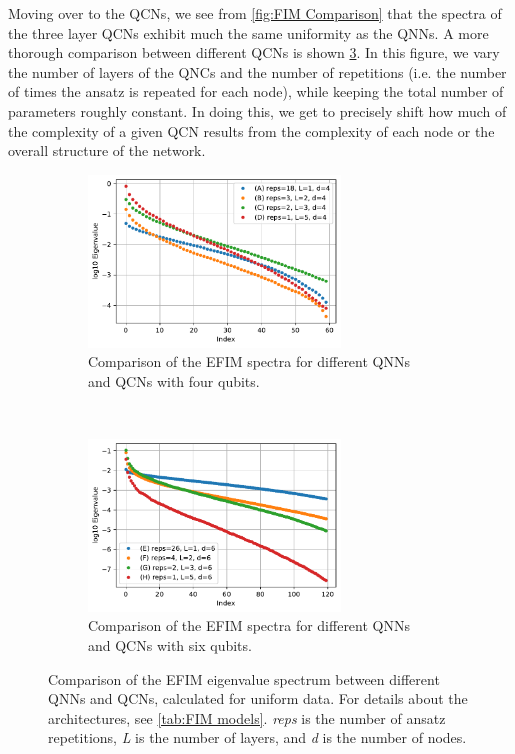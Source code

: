 Moving over to the QCNs, we see from \cref{fig:FIM Comparison} that the spectra of the three layer QCNs exhibit much the same uniformity as the QNNs. A more thorough comparison between different QCNs is shown \cref{fig:FIM QCN}. In this figure, we vary the number of layers of the QNCs and the number of repetitions (i.e. the number of times the ansatz is repeated for each node), while keeping the total number of parameters roughly constant. In doing this, we get to precisely shift how much of the complexity of a given QCN results from the complexity of each node or the overall structure of the network.

\begin{figure}[H]
    \centering
    \begin{subfigure}[t]{0.45\textwidth}
        \centering
        \includegraphics[height=1.8in]{latex/figures/FIM_qubits_4_comparison.pdf}
        \caption{Comparison of the EFIM spectra for different QNNs and QCNs with four qubits.}
        \label{fig:FIM QCN a}
    \end{subfigure}%
    ~ 
    \begin{subfigure}[t]{0.45\textwidth}
        \centering
        \includegraphics[height=1.8in]{latex/figures/FIM_qubits_6_comparison.pdf}
        \caption{Comparison of the EFIM spectra for different QNNs and QCNs with six qubits.}
        \label{fig:FIM QCN b}
    \end{subfigure}
    \caption{Comparison of the EFIM eigenvalue spectrum between different QNNs and QCNs, calculated for uniform data. For details about the architectures, see \cref{tab:FIM models}. \emph{reps} is the number of ansatz repetitions, \emph{L} is the number of layers, and \emph{d} is the number of nodes.}
    \label{fig:FIM QCN}
\end{figure}

